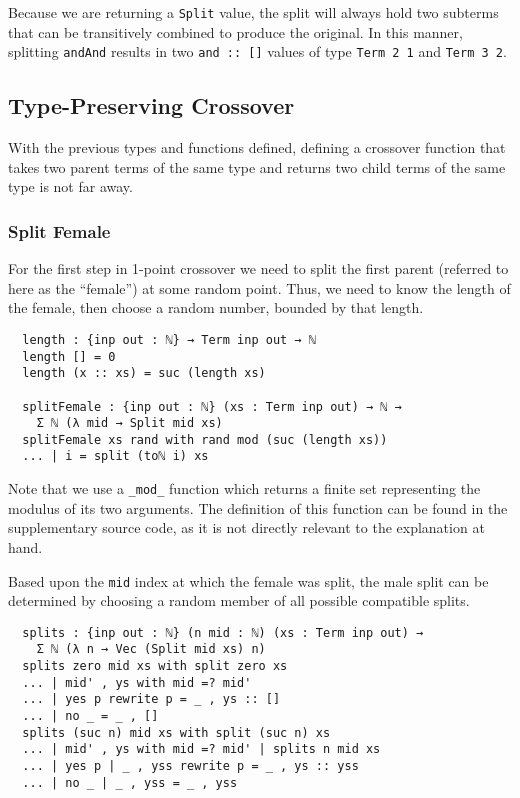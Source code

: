 \documentclass[runningheads,a4paper]{llncs}
\begin{document}
Because we are returning a \texttt{Split} value, the split will always
hold two subterms that can be transitively combined to produce the
original. In this manner, splitting \texttt{andAnd} results in two
\texttt{and :: []} values of type \texttt{Term 2 1} and
\texttt{Term 3 2}.

\subsection{Type-Preserving Crossover}

With the previous types and functions defined, defining a
crossover function that takes two parent terms of the same type and
returns two child terms of the same type is not far away.

\subsubsection{Split Female}

For the first step in 1-point crossover we need to split the first
parent (referred to here as the ``female'') at some random point. Thus, we
need to know the length of the female, then choose a random number,
bounded by that length.

\begin{verbatim}
  length : {inp out : ℕ} → Term inp out → ℕ
  length [] = 0
  length (x :: xs) = suc (length xs)

  splitFemale : {inp out : ℕ} (xs : Term inp out) → ℕ →
    Σ ℕ (λ mid → Split mid xs)
  splitFemale xs rand with rand mod (suc (length xs))
  ... | i = split (toℕ i) xs
\end{verbatim}

Note that we use a \texttt{\_mod\_} function which returns a finite set
representing the modulus of its two arguments. The definition of this
function can be found in the supplementary source code, as it is not
directly relevant to the explanation at hand.

Based upon the \texttt{mid} index at which the female was split, the
male split can be determined by choosing a random member of all
possible compatible splits.

\begin{verbatim}
  splits : {inp out : ℕ} (n mid : ℕ) (xs : Term inp out) →
    Σ ℕ (λ n → Vec (Split mid xs) n)
  splits zero mid xs with split zero xs
  ... | mid' , ys with mid =? mid'
  ... | yes p rewrite p = _ , ys :: []
  ... | no _ = _ , []
  splits (suc n) mid xs with split (suc n) xs
  ... | mid' , ys with mid =? mid' | splits n mid xs
  ... | yes p | _ , yss rewrite p = _ , ys :: yss
  ... | no _ | _ , yss = _ , yss
\end{verbatim}
\end{document}
